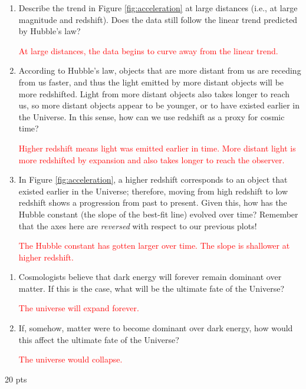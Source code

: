 \documentclass[11pt]{article}
\begin{document}
\begin{enumerate}
    \item [4 pts] Describe the trend in Figure \ref{fig:acceleration} at large distances (i.e., at large magnitude and redshift). Does the data still follow the linear trend predicted by Hubble's law?
    
    \textcolor{red}{At large distances, the data begins to curve away from the linear trend.}
    
    \item [4 pts] According to Hubble's law, objects that are more distant from us are receding from us faster, and thus the light emitted by more distant objects will be more redshifted. Light from more distant objects also takes longer to reach us, so more distant objects appear to be younger, or to have existed earlier in the Universe. In this sense, how can we use redshift as a proxy for cosmic time?
    
    \textcolor{red}{Higher redshift means light was emitted earlier in time. More distant light is more redshifted by expansion and also takes longer to reach the observer.}
    
    \item [4 pts] In Figure \ref{fig:acceleration}, a higher redshift corresponds to an object that existed earlier in the Universe; therefore, moving from high redshift to low redshift shows a progression from past to present. Given this, how has the Hubble constant (the slope of the best-fit line) evolved over time? Remember that the axes here are \emph{reversed} with respect to our previous plots!
    
    \textcolor{red}{The Hubble constant has gotten larger over time. The slope is shallower at higher redshift.}
\end{enumerate}

\begin{enumerate}[resume]
    \item [4 pts] Cosmologists believe that dark energy will forever remain dominant over matter. If this is the case, what will be the ultimate fate of the Universe?
    
    \textcolor{red}{The universe will expand forever.}
    
    \item [4 pts] If, somehow, matter were to become dominant over dark energy, how would this affect the ultimate fate of the Universe?
    
    \textcolor{red}{The universe would collapse.}
\end{enumerate}
20 pts
\end{document}
